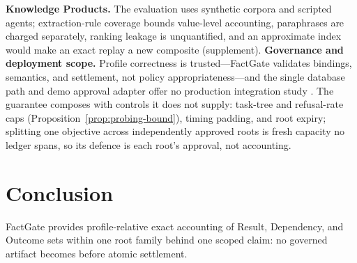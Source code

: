 \documentclass[10pt,journal,compsoc]{IEEEtran}
\newcommand{\system}{FactGate\xspace}
\newcommand{\code}[1]{\texttt{\detokenize{#1}}}
\begin{document}
\textbf{Knowledge Products.} The evaluation uses synthetic corpora and
scripted agents; extraction-rule coverage bounds value-level accounting,
paraphrases are charged separately, ranking leakage is unquantified, and an
approximate index would make an exact replay a new composite (supplement).
\textbf{Governance and deployment scope.} Profile correctness is
trusted---\system validates bindings, semantics, and settlement, not policy
appropriateness---and the single database path and demo approval adapter
offer no production integration study \cite{tonnarelli2026dataproductmcp}. The guarantee composes with controls it
does not supply: task-tree and refusal-rate caps (Proposition~\ref{prop:probing-bound}),
timing padding, and root expiry; splitting one objective across
independently approved roots is fresh capacity no ledger spans, so its
defence is each root's approval, not accounting.

\section{Conclusion}

\system provides profile-relative exact accounting of Result, Dependency,
and Outcome sets within one root family behind one scoped claim: no
governed artifact becomes \code{AVAILABLE} before atomic settlement.



\end{document}
